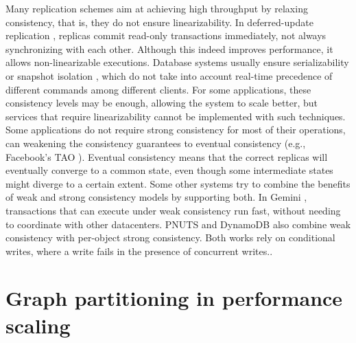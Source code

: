 Many replication schemes aim at achieving high throughput by relaxing
consistency, that is, they do not ensure linearizability. In deferred-update
replication \cite{chundi96dur, kobus2013hybrid, sciascia2012sdur, SousaOMP01},
replicas commit read-only transactions immediately, not always synchronizing
with each other. Although this indeed improves performance, it allows
non-linearizable executions. Database systems usually ensure serializability
\cite{BHG87} or snapshot isolation \cite{LinKJPA09}, which do not take into
account real-time precedence of different commands among different clients. For
some applications, these consistency levels may be enough, allowing the system
to scale better, but services that require linearizability cannot be implemented
with such techniques. Some applications do not require strong consistency for
most of their operations, can weakening the consistency guarantees to eventual
consistency (e.g., Facebook's TAO \cite{facebookTAO}). Eventual consistency
\cite{Gustavsson:2002eventual} means that the correct replicas will eventually
converge to a common state, even though some intermediate states might diverge
to a certain extent. Some other systems try to combine the benefits of weak and
strong consistency models by supporting both.  In Gemini \cite{Li2012geo},
transactions that can execute under weak consistency run fast, without needing
to coordinate with other datacenters. PNUTS \cite{Cooper2008PNUTSYH} and
DynamoDB \cite{Sivasubramanian:2012dynamo} also combine weak consistency with
per-object strong consistency. Both works rely on conditional writes, where a
write fails in the presence of concurrent writes..

\section{Graph partitioning in performance scaling}

